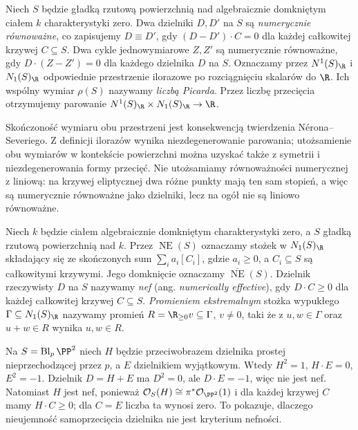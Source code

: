 \begin{definicja}
\label{def:ga8-numerical}
Niech $S$ będzie gładką rzutową powierzchnią nad algebraicznie
domkniętym ciałem $k$ charakterystyki zero. Dwa dzielniki
$D,D'$ na $S$ są \emph{numerycznie równoważne}, co zapisujemy
$D\equiv D'$, gdy $(D-D')\cdot C=0$ dla każdej całkowitej
krzywej $C\subseteq S$. Dwa cykle jednowymiarowe $Z,Z'$
są numerycznie równoważne, gdy $D\cdot(Z-Z')=0$ dla
każdego dzielnika $D$ na $S$. Oznaczamy przez
$N^1(S)_{\R}$ i $N_1(S)_{\R}$ odpowiednie przestrzenie
ilorazowe po rozciągnięciu skalarów do $\R$.
Ich wspólny wymiar $\rho(S)$ nazywamy \emph{liczbą Picarda}.
Przez liczbę przecięcia otrzymujemy parowanie
$N^1(S)_{\R}\times N_1(S)_{\R}\to\R$.
\end{definicja}

\begin{uwaga}
Skończoność wymiaru obu przestrzeni jest konsekwencją
twierdzenia Nérona--Severiego. Z definicji ilorazów
wynika niezdegenerowanie parowania; utożsamienie obu
wymiarów w kontekście powierzchni można uzyskać także
z symetrii i niezdegenerowania formy przecięć.
Nie utożsamiamy równoważności numerycznej z liniową:
na krzywej eliptycznej dwa różne punkty mają ten sam
stopień, a więc są numerycznie równoważne jako dzielniki,
lecz na ogół nie są liniowo równoważne.
\end{uwaga}

\begin{definicja}
\label{def:ga8-nef}
Niech $k$ będzie ciałem algebraicznie domkniętym
charakterystyki zero, a $S$ gładką rzutową
powierzchnią nad $k$. Przez $\operatorname{NE}(S)$
oznaczamy stożek w $N_1(S)_{\R}$ składający się ze
skończonych sum $\sum_i a_i[C_i]$, gdzie $a_i\ge0$,
a $C_i\subseteq S$ są całkowitymi krzywymi.
Jego domknięcie oznaczamy $\overline{\operatorname{NE}}(S)$.
Dzielnik rzeczywisty $D$ na $S$ nazywamy \emph{nef}
(ang. \emph{numerically effective}), gdy $D\cdot C\ge0$
dla każdej całkowitej krzywej $C\subseteq S$.
\emph{Promieniem ekstremalnym} stożka wypukłego
$\Gamma\subseteq N_1(S)_{\R}$ nazywamy promień
$R=\R_{\ge0}v\subseteq\Gamma$, $v\ne0$, taki że
z $u,w\in\Gamma$ oraz $u+w\in R$ wynika $u,w\in R$.
\end{definicja}

\begin{przyklad}
Na $S=\operatorname{Bl}_p\PP^2$ niech $H$ będzie
przeciwobrazem dzielnika prostej nieprzechodzącej przez $p$,
a $E$ dzielnikiem wyjątkowym.
Wtedy $H^2=1$, $H\cdot E=0$, $E^2=-1$.
Dzielnik $D=H+E$ ma $D^2=0$, ale $D\cdot E=-1$,
więc nie jest nef. Natomiast $H$ jest nef, ponieważ
$\mathcal O_S(H)\cong\pi^*\mathcal O_{\PP^2}(1)$
i dla każdej krzywej
$C$ mamy $H\cdot C\ge0$; dla $C=E$ liczba ta wynosi zero.
To pokazuje, dlaczego nieujemność samoprzecięcia
dzielnika nie jest kryterium nefności.
\end{przyklad}

